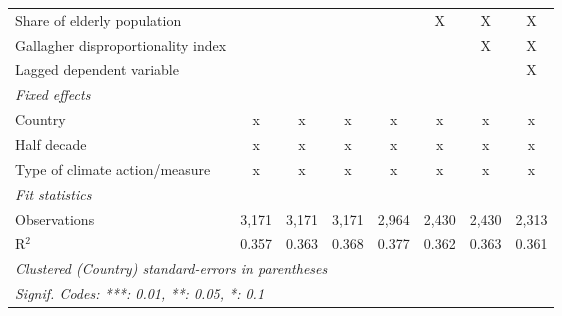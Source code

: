 \begin{tabular}{lccccccc}
   Share of elderly population                                                       &              &         &               &               & X              & X              & X\\  
   Gallagher disproportionality index                                                &              &         &               &               &                & X              & X\\  
   Lagged dependent variable                                                         &              &         &               &               &                &                & X\\  
   \emph{Fixed effects}\\
   Country                                                                           & x            & x       & x             & x             & x              & x              & x\\  
   Half decade                                                                       & x            & x       & x             & x             & x              & x              & x\\  
   Type of climate action/measure                                                    & x            & x       & x             & x             & x              & x              & x\\  
   \midrule \emph{Fit statistics}\\
   Observations                                                                      & 3,171        & 3,171   & 3,171         & 2,964         & 2,430          & 2,430          & 2,313\\  
   R$^2$                                                                             & 0.357        & 0.363   & 0.368         & 0.377         & 0.362          & 0.363          & 0.361\\  
   \midrule
   \multicolumn{8}{l}{\emph{Clustered (Country) standard-errors in parentheses}}\\
   \multicolumn{8}{l}{\emph{Signif. Codes: ***: 0.01, **: 0.05, *: 0.1}}\\
\end{tabular}
\par\endgroup


